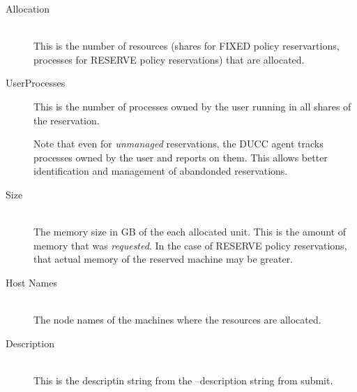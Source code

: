 \begin{description}
\item[Allocation] \hfill \\
  This is the number of resources (shares for FIXED policy reservartions, processes for
  RESERVE policy reservations) that are allocated.

\item[UserProcesses] This is the number of processes owned by the user running in all
  shares of the reservation.  
  
  Note that even for {\em unmanaged} reservations, the DUCC agent tracks processes owned
  by the user and reports on them.  This allows better identification and management of
  abandonded reservations.

\item[Size] \hfill \\
  The memory size in GB of the each allocated unit.  This is the amount of memory that
  was {\em requested}.  In the case of RESERVE policy reservations, that actual memory
  of the reserved machine may be greater.
  
\item[Host Names] \hfill \\
  The node names of the machines where the resources are allocated.
  
\item[Description] \hfill \\
  This is the descriptin string from the --description string from submit.
\end{description}

